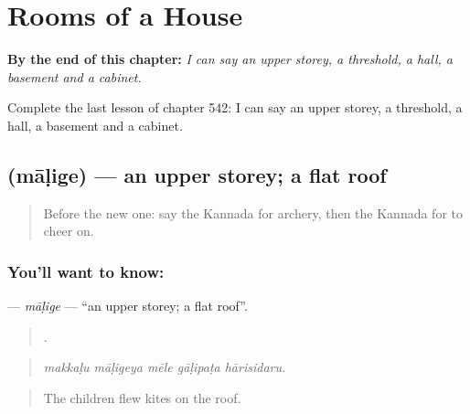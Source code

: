 
\chapter{Rooms of a House}
\label{ch:ka-rooms-of-a-house}

\begin{chapteropening}
\textbf{By the end of this chapter:} \emph{I can say an upper storey, a threshold, a hall, a basement and a cabinet.}

Complete the last lesson of chapter 542: I can say an upper storey, a threshold, a hall, a basement and a cabinet.
\end{chapteropening}

\section[\texorpdfstring{\kn{ಮಾಳಿಗೆ} (māḷige)}{ಮಾಳಿಗೆ (māḷige)}]{ (māḷige) — an upper storey; a flat roof}

\label{lesson:KA-C542-malige}



\begin{quote}
Before the new one: say the Kannada for archery, then the Kannada for to cheer on.
\end{quote}

\subsection*{You'll want to know: }
\textbf{} — \emph{māḷige} — \textquotedblleft{}an upper storey; a flat roof\textquotedblright{}.

\begin{quote}
    .
\end{quote}

\begin{quote}
\emph{makkaḷu māḷigeya mēle gāḷipaṭa hārisidaru.}
\end{quote}

\begin{quote}
The children flew kites on the roof.
\end{quote}


